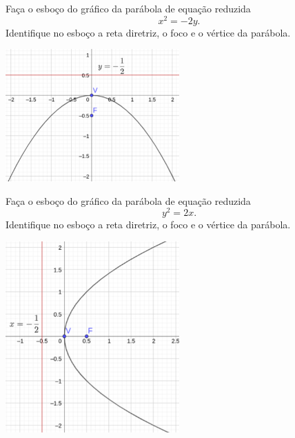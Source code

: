 \begin{exer}
  Faça o esboço do gráfico da parábola de equação reduzida
  \begin{equation}
    x^2 = -2y.
  \end{equation}
  Identifique no esboço a reta diretriz, o foco e o vértice da parábola.
\end{exer}
\begin{resp}
  \includegraphics[width=0.5\textwidth]{cap_conicas/dados/fig_parabola_exer_x2-2y/fig}
\end{resp}

\begin{exer}
  Faça o esboço do gráfico da parábola de equação reduzida
  \begin{equation}
    y^2 = 2x.
  \end{equation}
  Identifique no esboço a reta diretriz, o foco e o vértice da parábola.
\end{exer}
\begin{resp}
  \includegraphics[width=0.5\textwidth]{cap_conicas/dados/fig_parabola_exer_y2_2x/fig}
\end{resp}

